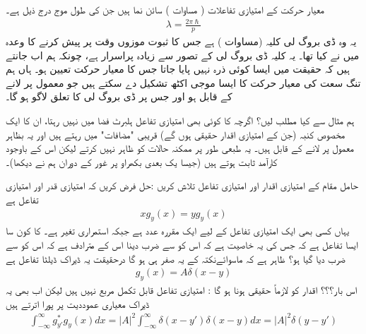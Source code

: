 معیار حرکت کے امتیازی تفاعلات ( مساوات )  سائن  نما ہیں جن کی طول موج درج ذیل ہے۔
\begin{align}
\lambda = \frac{2\pi\hslash}{p} 
\end{align}
یہ وہ ڈی بروگ لی کلیہ (مساوات ) ہے جس کا ثبوت موزوں وقت پر پیش کرنے کا  وعدہ میں نے کیا تھا۔  یہ کلیہ  ڈی بروگ لی کے تصور  سے   زیادہ پراسرار ہے،  چونکہ ہم اب  جانتے ہیں کہ  حقیقت میں ایسا کوئی ذرہ نہیں پایا جاتا جس کا معیار حرکت  تعیین ہو۔  ہاں ہم تنگ سعت  کی معیار حرکت کا ایسا موجی اکٹھ  تشکیل دے  سکتے ہیں جو معمول پر لانے کے قابل ہو اور جس پر  ڈی بروگ لی کا تعلق  لاگو ہو گا۔

ہم مثال   سے کیا مطلب لیں؟ اگرچہ  کا کوئی بھی امتیازی تفاعل ہلبرٹ فضا میں نہیں رہتا،    ان کا ایک مخصوص کنبہ  (جن کے امتیازی اقدار حقیقی ہوں گے) قریبی "مضافات"  میں  رہتے ہیں اور یہ بظاہر معمول پر لانے کے قابل ہیں۔  یہ طبعی طور پر ممکنہ حالات کو ظاہر نہیں کرتے  لیکن اس کے باوجود کارآمد ثابت ہوتے ہیں (جیسا یک بعدی بکھراو  پر غور کے دوران ہم نے دیکھا)۔

حامل مقام کے امتیازی اقدار اور امتیازی تفاعل تلاش کریں
:حل
فرض کریں کہ  امتیازی قدر اور  امتیازی تفاعل ہے
\begin{align}
xg_{y}(x) = yg_{y}(x) 
\end{align}
یہاں کسی بھی ایک امتیازی تفاعل کے لیے  ایک مقررہ عدد ہے جبکہ  استمراری تغیر ہے۔  کا کون سا ایسا تفاعل ہے کہ جس کی یہ خاصیت ہے کہ اس کو  سے ضرب دینا اس کے مترادف ہے کہ اس کو  سے ضرب دیا گیا ہو؟ ظاہر ہے کہ ماسوائےنکتہ  کے یہ صفر ہی ہو گا درحقیقت یہ ڈیراک ڈیلٹا تفاعل ہے
\begin{align*}
g_{y}(x) = A\delta(x-y)
\end{align*}
اس بار؟؟؟ اقدار کو لازماً حقیقی ہونا ہو گا : امتیازی تفاعل قابل تکمل مربع نہیں ہیں لیکن اب بھی یہ ڈیراک معیاری عموددیت پر پورا اترتے ہیں
\begin{align}
\int_{-\infty}^{\infty}g_{y'}^{*}g_{y}(x) dx = |A|^{2}\int_{-\infty}^{\infty}\delta(x-y')\delta(x-y) dx = |A|^{2} \delta (y-y')
\end{align}


